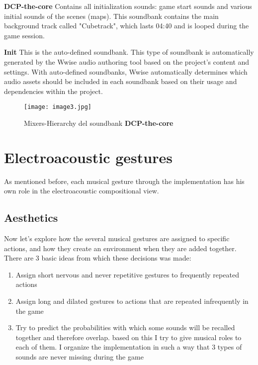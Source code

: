 \begin{compactitem}
		\item \textbf{DCP-the-core} Contains all initialization sounds: game start sounds and various initial sounds of the scenes (maps). This soundbank contains the main background track called "Cubetrack", which lasts 04:40 and is looped during the game session.

		\item \textbf{Init} This is the auto-defined soundbank. This type of soundbank is automatically generated by the Wwise audio authoring tool based on the project's content and settings.
		With auto-defined soundbanks, Wwise automatically determines which audio assets should be included in each soundbank based on their usage and dependencies within the project.
	\end{compactitem}

	\begin{figure}[h]
		\begin{center}
			\texttt{[image: image3.jpg]}
			\caption{Mixers-Hierarchy del soundbank \textbf{DCP-the-core}}
		\end{center}
	\end{figure}

\section{Electroacoustic gestures}
As mentioned before, each musical gesture through the implementation has his own role in the electroacoustic compositional view.

	\subsection{Aesthetics}
	Now let's explore how the several musical gestures are assigned to specific actions, and how they create an environment when they are added together. There are 3 basic ideas from which these decisions was made:
		\begin{enumerate}
			\item Assign short nervous and never repetitive gestures to frequently repeated actions
			\item Assign long and dilated gestures to actions that are repeated infrequently in the game
			\item Try to predict the probabilities with which some sounds will be recalled together and therefore overlap. based on this I try to give musical roles to each of them. I organize the implementation in such a way that 3 types of sounds are never missing during the game
		\end{enumerate}

